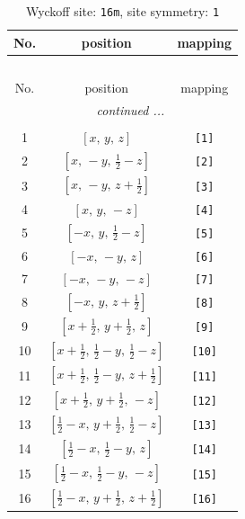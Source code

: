 \documentclass[fleqn,8pt]{jsarticle}
\begin{document}
\begin{longtable}{ccc}
\caption{Wyckoff site: {\tt 16m}, site symmetry: {\tt 1}}
 \\
 \hline \hline
No. & position & mapping \\ \hline \endfirsthead

\multicolumn{2}{l}{\tablename\ \thetable{}} \\
 \hline \hline
No. & position & mapping \\ \hline \endhead

 \hline \hline
\multicolumn{2}{r}{\footnotesize\it continued ...} \\ \endfoot

 \hline \hline
\multicolumn{2}{r}{} \\ \endlastfoot

1 & $\left[ x,\, y,\, z \right]$ & {\tt [1]} \\ \hline
2 & $\left[ x,\, - y,\, \frac{1}{2} - z \right]$ & {\tt [2]} \\ \hline
3 & $\left[ x,\, - y,\, z + \frac{1}{2} \right]$ & {\tt [3]} \\ \hline
4 & $\left[ x,\, y,\, - z \right]$ & {\tt [4]} \\ \hline
5 & $\left[ - x,\, y,\, \frac{1}{2} - z \right]$ & {\tt [5]} \\ \hline
6 & $\left[ - x,\, - y,\, z \right]$ & {\tt [6]} \\ \hline
7 & $\left[ - x,\, - y,\, - z \right]$ & {\tt [7]} \\ \hline
8 & $\left[ - x,\, y,\, z + \frac{1}{2} \right]$ & {\tt [8]} \\ \hline
9 & $\left[ x + \frac{1}{2},\, y + \frac{1}{2},\, z \right]$ & {\tt [9]} \\ \hline
10 & $\left[ x + \frac{1}{2},\, \frac{1}{2} - y,\, \frac{1}{2} - z \right]$ & {\tt [10]} \\ \hline
11 & $\left[ x + \frac{1}{2},\, \frac{1}{2} - y,\, z + \frac{1}{2} \right]$ & {\tt [11]} \\ \hline
12 & $\left[ x + \frac{1}{2},\, y + \frac{1}{2},\, - z \right]$ & {\tt [12]} \\ \hline
13 & $\left[ \frac{1}{2} - x,\, y + \frac{1}{2},\, \frac{1}{2} - z \right]$ & {\tt [13]} \\ \hline
14 & $\left[ \frac{1}{2} - x,\, \frac{1}{2} - y,\, z \right]$ & {\tt [14]} \\ \hline
15 & $\left[ \frac{1}{2} - x,\, \frac{1}{2} - y,\, - z \right]$ & {\tt [15]} \\ \hline
16 & $\left[ \frac{1}{2} - x,\, y + \frac{1}{2},\, z + \frac{1}{2} \right]$ & {\tt [16]} \\
\end{longtable}
\end{document}

